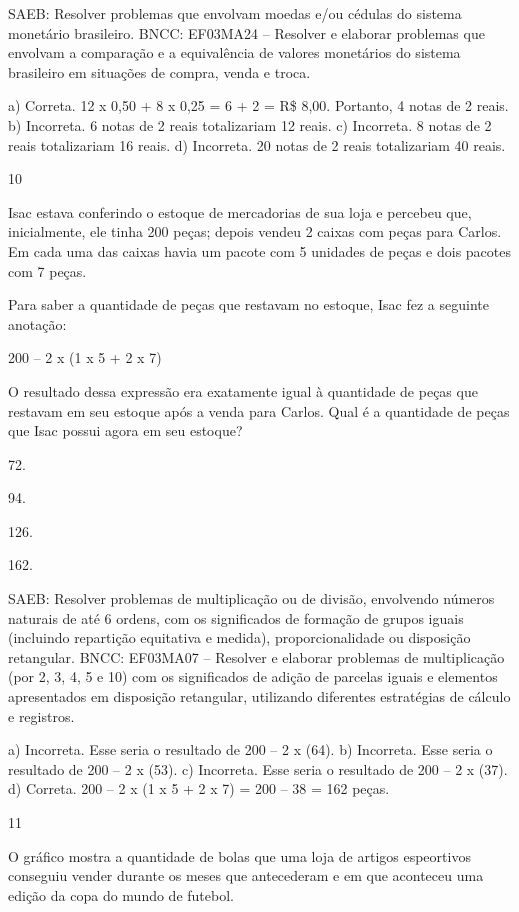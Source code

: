 \begin{multicols}{2}
\begin{enumerate}
{SAEB: Resolver problemas que envolvam moedas e/ou cédulas do sistema monetário brasileiro.
BNCC: EF03MA24 -- Resolver e elaborar problemas que envolvam a comparação e a equivalência de
valores monetários do sistema brasileiro em situações de compra, venda e troca.

a) Correta. 12 x 0,50 + 8 x 0,25 = 6 + 2 = R\$ 8,00. Portanto, 4 notas de 2 reais.
b) Incorreta. 6 notas de 2 reais totalizariam 12 reais.
c) Incorreta. 8 notas de 2 reais totalizariam 16 reais.
d) Incorreta. 20 notas de 2 reais totalizariam 40 reais.

\num{10}

Isac estava conferindo o estoque de mercadorias de sua loja e percebeu que, inicialmente, ele tinha 200 peças; depois vendeu 2 caixas com peças para Carlos. Em cada uma das caixas havia um pacote com 5 unidades de peças e dois pacotes com 7 peças.

Para saber a quantidade de peças que restavam no estoque, Isac fez a seguinte anotação:

200 -- 2 x (1 x 5 + 2 x 7)

O resultado dessa expressão era exatamente igual à quantidade de peças que restavam em seu estoque após a venda para Carlos. Qual é a quantidade de peças que Isac possui agora em seu estoque?

\begin{escolha}
\item
  72.
\item
  94.
\item
  126.
\item
  162.
\end{escolha}

SAEB: Resolver problemas de multiplicação ou de divisão, envolvendo números naturais de até 6 ordens, com os significados de formação de grupos iguais (incluindo repartição equitativa e medida), proporcionalidade ou disposição retangular.
BNCC: EF03MA07 – Resolver e elaborar problemas de multiplicação (por 2, 3, 4, 5 e 10) com os
significados de adição de parcelas iguais e elementos apresentados em disposição retangular, utilizando diferentes estratégias de cálculo e registros.

a) Incorreta. Esse seria o resultado de 200 -- 2 x (64).
b) Incorreta. Esse seria o resultado de 200 -- 2 x (53).
c) Incorreta. Esse seria o resultado de 200 -- 2 x (37).
d) Correta. 200 -- 2 x (1 x 5 + 2 x 7) = 200 -- 38 = 162 peças.

\num{11}

O gráfico mostra a quantidade de bolas que uma loja de artigos espeortivos conseguiu vender durante os meses que antecederam e em que aconteceu uma edição da copa do mundo de futebol.

}
\end{enumerate}
\end{multicols}
